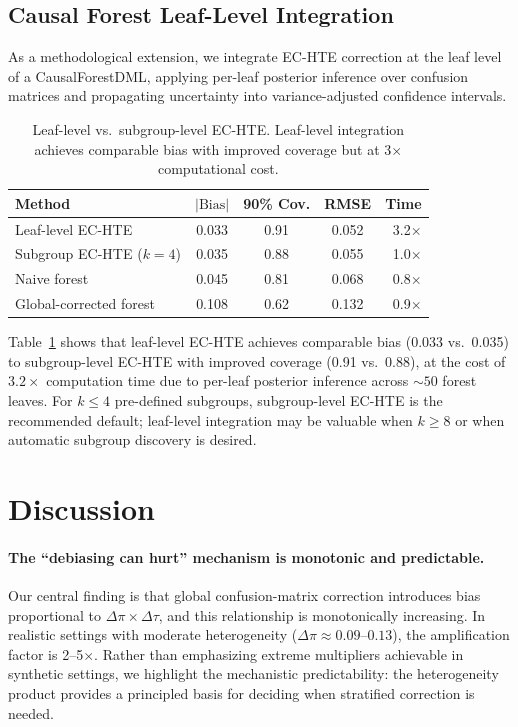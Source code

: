 \documentclass[11pt,a4paper]{article}
\begin{document}
\subsection{Causal Forest Leaf-Level Integration}
\label{sec:leaf}

As a methodological extension, we integrate EC-HTE correction at the leaf level of a CausalForestDML, applying per-leaf posterior inference over confusion matrices and propagating uncertainty into variance-adjusted confidence intervals.

\begin{table}[t]
\centering
\small
\caption{Leaf-level vs.\ subgroup-level EC-HTE. Leaf-level integration achieves comparable bias with improved coverage but at 3$\times$ computational cost.}
\label{tab:leaf}
\begin{tabular}{lcccr}
\toprule
Method & $|\text{Bias}|$ & 90\% Cov. & RMSE & Time \\
\midrule
Leaf-level EC-HTE & 0.033 & 0.91 & 0.052 & 3.2$\times$ \\
Subgroup EC-HTE ($k{=}4$) & 0.035 & 0.88 & 0.055 & 1.0$\times$ \\
Naive forest & 0.045 & 0.81 & 0.068 & 0.8$\times$ \\
Global-corrected forest & 0.108 & 0.62 & 0.132 & 0.9$\times$ \\
\bottomrule
\end{tabular}
\end{table}

Table~\ref{tab:leaf} shows that leaf-level EC-HTE achieves comparable bias (0.033 vs.\ 0.035) to subgroup-level EC-HTE with improved coverage (0.91 vs.\ 0.88), at the cost of $3.2\times$ computation time due to per-leaf posterior inference across ${\sim}50$ forest leaves.
For $k \leq 4$ pre-defined subgroups, subgroup-level EC-HTE is the recommended default; leaf-level integration may be valuable when $k \geq 8$ or when automatic subgroup discovery is desired.

\section{Discussion}

\paragraph{The ``debiasing can hurt'' mechanism is monotonic and predictable.}
Our central finding is that global confusion-matrix correction introduces bias proportional to $\Delta\pi \times \Delta\tau$, and this relationship is monotonically increasing.
In realistic settings with moderate heterogeneity ($\Delta\pi \approx 0.09$--$0.13$), the amplification factor is 2--5$\times$.
Rather than emphasizing extreme multipliers achievable in synthetic settings, we highlight the mechanistic predictability: the heterogeneity product provides a principled basis for deciding when stratified correction is needed.
\end{document}

